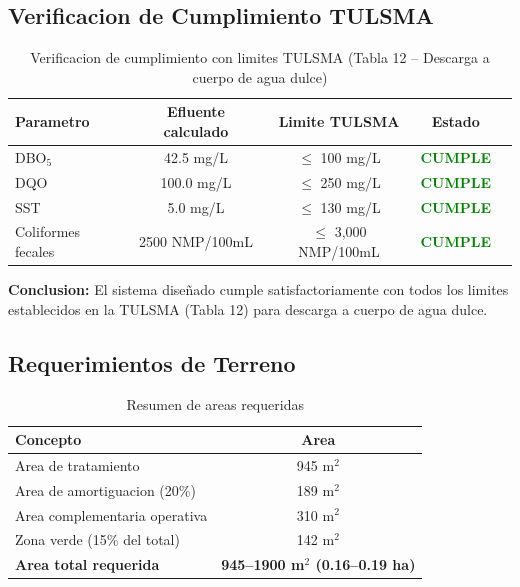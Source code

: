 \documentclass[12pt,a4paper]{article}
\begin{document}
\subsection{Verificacion de Cumplimiento TULSMA}

\begin{table}[H]
\centering
\caption{Verificacion de cumplimiento con limites TULSMA (Tabla 12 -- Descarga a cuerpo de agua dulce)}
\begin{tabular}{lcccc}
\toprule
\textbf{Parametro} & \textbf{Efluente calculado} & \textbf{Limite TULSMA} & \textbf{Estado} \\
\midrule
DBO$_5$ & 42.5 mg/L & $\leq$ 100 mg/L & \textcolor{green}{\textbf{CUMPLE}} \\
DQO & 100.0 mg/L & $\leq$ 250 mg/L & \textcolor{green}{\textbf{CUMPLE}} \\
SST & 5.0 mg/L & $\leq$ 130 mg/L & \textcolor{green}{\textbf{CUMPLE}} \\
Coliformes fecales & 2500 NMP/100mL & $\leq$ 3,000 NMP/100mL & \textcolor{green}{\textbf{CUMPLE}} \\
\bottomrule
\end{tabular}
\end{table}

\textbf{Conclusion:} El sistema dise\~nado cumple satisfactoriamente con todos los limites establecidos en la TULSMA (Tabla 12) para descarga a cuerpo de agua dulce.

\subsection{Requerimientos de Terreno}

\begin{table}[H]
\centering
\caption{Resumen de areas requeridas}
\begin{tabular}{lc}
\toprule
\textbf{Concepto} & \textbf{Area} \\
\midrule
Area de tratamiento & 945 m$^2$ \\
Area de amortiguacion (20\%) & 189 m$^2$ \\
Area complementaria operativa & 310 m$^2$ \\
Zona verde (15\% del total) & 142 m$^2$ \\
\midrule
\textbf{Area total requerida} & \textbf{945--1900 m$^2$ (0.16--0.19 ha)} \\
\bottomrule
\end{tabular}
\end{table}
\end{document}
